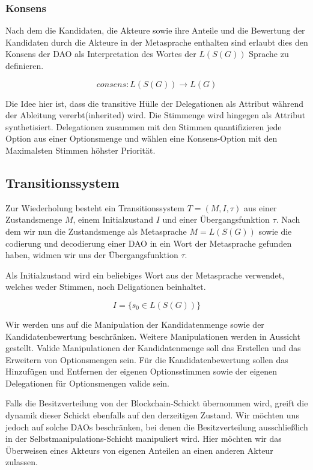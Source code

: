 \documentclass[a4paper,12pt]{report}
\begin{document}
\subsubsection*{Konsens}

Nach dem die Kandidaten, die Akteure sowie ihre Anteile und die Bewertung der Kandidaten durch die Akteure in der Metasprache enthalten sind erlaubt dies den Konsens der DAO als Interpretation des Wortes der $L(S(G))$ Sprache zu definieren. 

\[ consens: L(S(G)) \rightarrow L(G) \] 

Die Idee hier ist, dass die transitive Hülle der Delegationen als
Attribut während der Ableitung vererbt(inherited) wird. Die Stimmenge 
wird hingegen als Attribut synthetisiert.\cite{Knuth1968} Delegationen zusammen mit den Stimmen quantifizieren jede Option aus einer Optionsmenge und wählen
eine Konsens-Option mit den Maximalsten Stimmen höhster Priorität.



\subsection{Transitionssystem}

Zur Wiederholung besteht ein Transitionssystem $T=(M,I,\tau)$ aus einer Zustandsmenge $M$, einem Initialzustand $I$ und einer Übergangsfunktion $\tau$.
Nach dem wir nun die Zustandsmenge als Metasprache $M=L(S(G))$ sowie die codierung und decodierung einer DAO in ein Wort der Metasprache gefunden haben, widmen wir uns der Übergangsfunktion $\tau$.

Als Initialzustand wird ein beliebiges Wort aus der Metasprache verwendet, welches weder Stimmen, noch Deligationen beinhaltet.

\[ I = \{s_0\in L(S(G))\} \] 

Wir werden uns auf die Manipulation der Kandidatenmenge sowie der Kandidatenbewertung beschränken. Weitere Manipulationen werden in Aussicht gestellt. Valide Manipulationen der Kandidatenmenge soll das Erstellen und das Erweitern von Optionsmengen sein. Für die Kandidatenbewertung sollen das Hinzufügen und Entfernen der eigenen Optionsstimmen sowie der eigenen Delegationen für Optionsmengen valide sein. 

Falls die Besitzverteilung von der Blockchain-Schickt übernommen wird, greift die dynamik dieser Schickt ebenfalls auf den derzeitigen Zustand. Wir möchten uns jedoch auf solche DAOs beschränken, bei denen die Besitzverteilung ausschließlich in der Selbstmanipulations-Schicht manipuliert wird. Hier möchten wir das Überweisen eines Akteurs von eigenen Anteilen an einen anderen Akteur zulassen.
\end{document}
